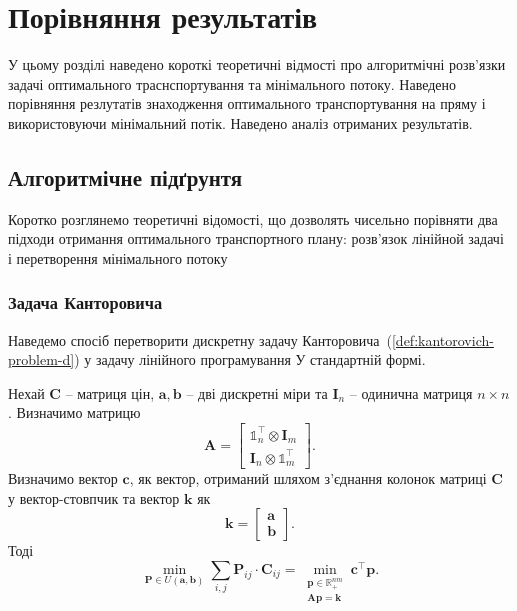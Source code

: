 \chapter{Порівняння результатів}
\label{chap:experiment}

У цьому розділі наведено короткі теоретичні відмості про алгоритмічні розв'язки задачі оптимального траснспортування та 
мінімального потоку. Наведено порівняння резлутатів знаходження оптимального транспортування на пряму і використовуючи мінімальний
потік. Наведено аналіз отриманих результатів.

\section{Алгоритмічне підґрунтя}
Коротко розглянемо теоретичні відомості, що дозволять чисельно порівняти два підходи отримання оптимального транспортного плану:
розв'язок лінійной задачі і перетворення мінімального потоку

\subsection{Задача Канторовича}
Наведемо спосіб перетворити дискретну задачу Канторовича~(\ref{def:kantorovich-problem-d}) у задачу лінійного програмування У
стандартній формі.

\begin{claim}
    Нехай $\mathbf{C}$ -- матриця цін, $\mathbf{a}, \mathbf{b}$ -- дві дискретні міри
    та $\mathbf{I}_n$ -- одинична матриця $n \times n$. Визначимо матрицю
    $$
    \mathbf{A} = 
    \begin{bmatrix}
    \mathbb{1}_n^\top \otimes \mathbf{I}_m \\
    \mathbf{I}_n \otimes \mathbb{1}_m^\top
    \end{bmatrix}.
    $$
    Визначимо вектор $\mathbf{c}$, як вектор, отриманий шляхом з'єднання колонок матриці $\mathbf{C}$ у вектор-стовпчик
    та вектор $\mathbf{k}$ як
    $$ \mathbf{k} =
        \begin{bmatrix}
            \mathbf{a} \\
            \mathbf{b}
        \end{bmatrix}.
    $$
    Тоді
    \begin{equation}
        \label{eq:kantorovich-linear}
        \min_{\mathbf{P} \in U\left(\mathbf{a}, \mathbf{b}\right)} \sum_{i,j} \mathbf{P}_{ij} \cdot \mathbf{C}_{ij} =
        \min_{\substack{
            \mathbf{p} \in \mathbb{R}_+^{nm} \\
            \mathbf{A}\mathbf{p} = \mathbf{k}
        }}
        \mathbf{c}^\top \mathbf{p}.
    \end{equation}
\end{claim}

